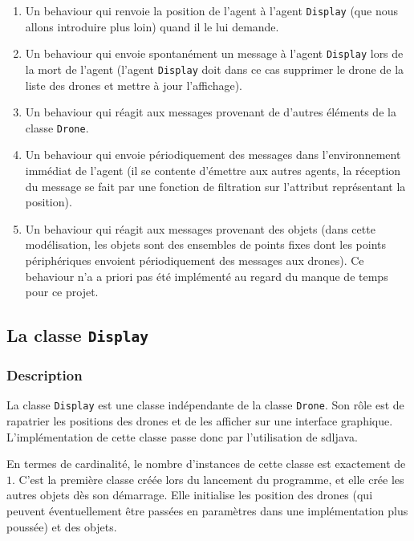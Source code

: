 \documentclass[11pt]{report}
\begin{document}
\begin{enumerate}
\item Un behaviour qui renvoie la position de l'agent à l'agent \verb|Display| (que nous allons introduire plus loin) quand il le lui demande.

\item Un behaviour qui envoie spontanément un message à l'agent \verb|Display| lors de la mort de l'agent (l'agent \verb|Display| doit dans ce cas supprimer le drone de la liste des drones et mettre à jour l'affichage).

\item Un behaviour qui réagit aux messages provenant de d'autres éléments de la classe \verb|Drone|.

\item Un behaviour qui envoie périodiquement des messages dans l'environnement immédiat de l'agent (il se contente d'émettre aux autres agents, la réception du message se fait par une fonction de filtration sur l'attribut représentant la position).

\item Un behaviour qui réagit aux messages provenant des objets (dans cette modélisation, les objets sont des ensembles de points fixes dont les points périphériques envoient périodiquement des messages aux drones). Ce behaviour n'a a priori pas été implémenté au regard du manque de temps pour ce projet.
\end{enumerate}

\subsection{La classe \protect\Verb+Display+}

\subsubsection{Description}

La classe \verb|Display| est une classe indépendante de la classe \verb|Drone|. Son rôle est de rapatrier les positions des drones et de les afficher sur une interface graphique. L'implémentation de cette classe passe donc par l'utilisation de sdljava. 

En termes de cardinalité, le nombre d'instances de cette classe est exactement de $1$. C'est la première classe créée lors du lancement du programme, et elle crée les autres objets dès son démarrage. Elle initialise les position des drones (qui peuvent éventuellement être passées en paramètres dans une implémentation plus poussée) et des objets.
\end{document}
